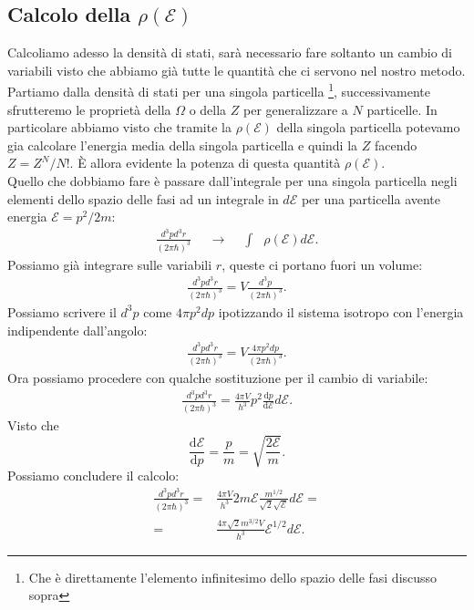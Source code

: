 \subsection{Calcolo della $\rho\left( \mathcal{E} \right)$}%
\label{subsec:dens-stati}
Calcoliamo adesso la densità di stati, sarà necessario fare soltanto un cambio di variabili visto che abbiamo già tutte le quantità che ci servono nel nostro metodo.\\
Partiamo dalla densità di stati per una singola particella \footnote{Che è direttamente l'elemento infinitesimo dello spazio delle fasi discusso sopra}, successivamente sfrutteremo le proprietà della $\Omega$ o della $Z$ per generalizzare a $N$ particelle. In particolare abbiamo visto che tramite la $\rho\left( \mathcal{E} \right)$ della singola particella potevamo gia calcolare l'energia media della singola particella e quindi la $Z$ facendo $Z = Z^{N}/N!$. È allora evidente la potenza di questa quantità $\rho\left( \mathcal{E} \right)$.\\
Quello che dobbiamo fare è passare dall'integrale per una singola particella negli elementi dello spazio delle fasi ad un integrale in $d\mathcal{E}$ per una particella avente energia $ \mathcal{E} = p^2/2m$:
\begin{align}
	\frac{d^3p d^3r}{\left( 2\pi\hbar \right)^3 }&  
	&\longrightarrow&  
	&\int&\rho\left( \mathcal{E} \right) d\mathcal{E}
.\end{align}
Possiamo già integrare sulle variabili $r$, queste ci portano fuori un volume:
\begin{align}
	\frac{d^3p d^3r}{\left( 2\pi\hbar \right)^3 } = V \frac{d^3p}{\left( 2\pi \hbar  \right)^3} 
.\end{align}
Possiamo scrivere il $d^3p$ come $4\pi p^2 dp$ ipotizzando il sistema isotropo con l'energia indipendente dall'angolo:
\begin{align}
	\frac{d^3p d^3r}{\left( 2\pi\hbar \right)^3 } = V \frac{4\pi p^2 dp}{\left( 2\pi\hbar \right)^3 } 
.\end{align}
Ora possiamo procedere con qualche sostituzione per il cambio di variabile:
\begin{align}
	\frac{d^3p d^3r}{\left( 2\pi\hbar \right)^3 } = \frac{4\pi V}{h^3}p^2 \frac{\mbox{d} p}{\mbox{d} \mathcal{E}} d\mathcal{E} 
.\end{align}
Visto che 
 \[
	\frac{\mbox{d} \mathcal{E}}{\mbox{d} p} = \frac{p}{m} = \sqrt{\frac{2\mathcal{E}}{m}} 
.\] 
Possiamo concludere il calcolo:
\begin{align}
	\frac{d^3p d^3r}{\left( 2\pi\hbar \right)^3 } =&\frac{4\pi V}{h^3}2m\mathcal{E}\frac{m ^{1 /2}}{\sqrt{2} \sqrt{\mathcal{E}}} d\mathcal{E} =\\
	=&\frac{4\pi \sqrt{2} m ^{3 /2} V}{h ^3} \mathcal{E}^{1 /2} d\mathcal{E}
.\end{align}
